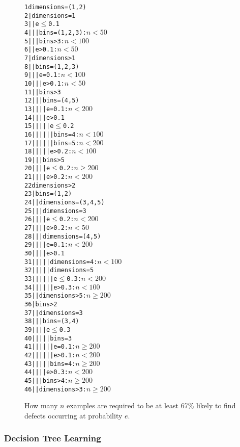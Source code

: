 \begin{figure}
\renewcommand{\baselinestretch}{0.75}
\begin{alltt}\scriptsize 
     1	  dimensions = (1,2)
     2	  |   dimensions = 1
     3	  |   |   e \(\le\) 0.1
     4	  |   |   |   bins = (1,2,3) : \(n < 50\) 
     5	  |   |   |   bins > 3       : \(n < 100\) 
     6	  |   |   e > 0.1 : \(n < 50\)  
     7	  |   dimensions > 1
     8	  |   |   bins = (1,2,3)
     9	  |   |   |   e = 0.1 : \(n < 100\) 
    10	  |   |   |   e > 0.1 : \(n < 50\)  
    11	  |   |   bins > 3
    12	  |   |   |   bins = (4,5)
    13	  |   |   |   |   e = 0.1 : \(n < 200\) 
    14	  |   |   |   |   e > 0.1
    15	  |   |   |   |   |   e \(\le\) 0.2
    16	  |   |   |   |   |   |   bins = 4 : \(n < 100\) 
    17	  |   |   |   |   |   |   bins = 5 : \(n < 200\) 
    18	  |   |   |   |   |   e > 0.2      : \(n < 100\) 
    19	  |   |   |   bins > 5
    20	  |   |   |   |   e \(\le\) 0.2 : \(n \ge 200 \) 
    21	  |   |   |   |   e > 0.2 : \(n < 200\)
    22	  dimensions > 2
    23	  |   bins = (1,2)
    24	  |   |   dimensions = (3,4,5)
    25	  |   |   |   dimensions = 3
    26	  |   |   |   |   e \(\le\) 0.2 : \(n < 200\) 
    27	  |   |   |   |   e > 0.2 : \(n < 50\) 
    28	  |   |   |   dimensions = (4,5)
    29	  |   |   |   |   e = 0.1 : \(n < 200\) 
    30	  |   |   |   |   e > 0.1
    31	  |   |   |   |   |   dimensions = 4 : \(n < 100\) 
    32	  |   |   |   |   |   dimensions = 5
    33	  |   |   |   |   |   |   e \(\le\) 0.3 : \(n < 200\) 
    34	  |   |   |   |   |   |   e > 0.3 : \(n < 100\) 
    35	  |   |   dimensions > 5 : \(n \ge 200 \) 
    36	  |   bins > 2
    37	  |   |   dimensions = 3
    38	  |   |   |   bins = (3,4)
    39	  |   |   |   |   e \(\le\) 0.3
    40	  |   |   |   |   |   bins = 3
    41	  |   |   |   |   |   |   e = 0.1 : \(n \ge 200 \) 
    42	  |   |   |   |   |   |   e > 0.1 : \(n < 200\) 
    43	  |   |   |   |   |   bins = 4 : \(n \ge 200 \) 
    44	  |   |   |   |   e > 0.3 : \(n < 200\) 
    45	  |   |   |   bins > 4 : \(n \ge 200 \) 
    46	  |   |   dimensions > 3 : \(n \ge 200 \)
\end{alltt}
\caption{How many $n$ examples are required to be at least 67\%
likely to find defects occurring at probability $e$.}\label{fig:dtree}
\end{figure}
\subsubsection{Decision Tree Learning}

